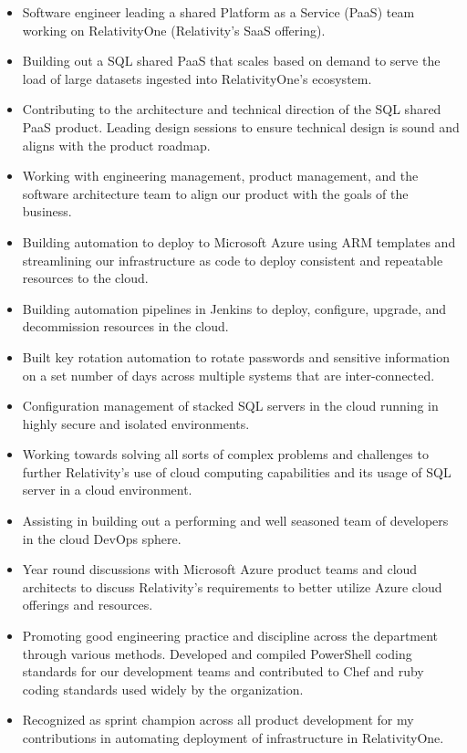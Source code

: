 \documentclass[margin]{res}
\begin{document}
\begin{resume}
\begin{itemize}
	\item Software engineer leading a shared Platform as a Service (PaaS) team working on RelativityOne (Relativity's SaaS offering).
	\item Building out a SQL shared PaaS that scales based on demand to serve the load of large datasets ingested into RelativityOne's ecosystem.
	\item Contributing to the architecture and technical direction of the SQL shared PaaS product. Leading design sessions to ensure technical design is sound and aligns with the product roadmap.
	\item Working with engineering management, product management, and the software architecture team to align our product with the goals of the business.
	\item Building automation to deploy to Microsoft Azure using ARM templates and streamlining our infrastructure as code to deploy consistent and repeatable resources to the cloud.
	\item Building automation pipelines in Jenkins to deploy, configure, upgrade, and decommission resources in the cloud.
	\item Built key rotation automation to rotate passwords and sensitive information on a set number of days across multiple systems that are inter-connected.
	\item Configuration management of stacked SQL servers in the cloud running in highly secure and isolated environments.
	\item Working towards solving all sorts of complex problems and challenges to further Relativity's use of cloud computing capabilities and its usage of SQL server in a cloud environment.
	\item Assisting in building out a performing and well seasoned team of developers in the cloud DevOps sphere.
	\item Year round discussions with Microsoft Azure product teams and cloud architects to discuss Relativity's requirements to better utilize Azure cloud offerings and resources.
	\item Promoting good engineering practice and discipline across the department through various methods. Developed and compiled PowerShell coding standards for our development teams and contributed to Chef and ruby coding standards used widely by the organization.
	\item Recognized as sprint champion across all product development for my contributions in automating deployment of infrastructure in RelativityOne.

\end{itemize}
\end{resume}
\end{document}
